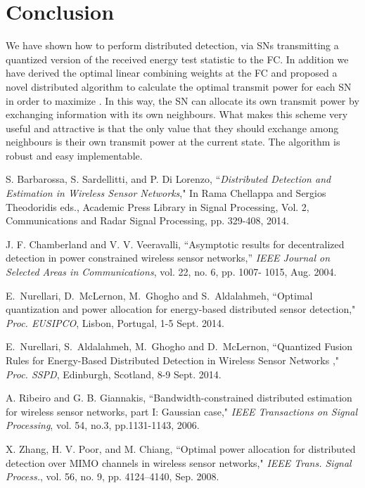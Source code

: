 \documentclass[conference]{IEEEtran}
\begin{document}
\section{Conclusion}
\label{CONCLUSION}
We have shown how to perform distributed detection, via SNs transmitting a quantized version of the received energy test statistic to the FC. In addition we have derived the optimal linear combining weights at the FC and proposed a novel distributed algorithm to calculate the optimal transmit power for each SN in order to maximize . In this way, the SN can allocate its own transmit power by exchanging information with its own neighbours. What makes this scheme very useful and attractive is that the only value that they should exchange among neighbours is their own transmit power at the current state. The algorithm is robust and easy implementable.
\begin{thebibliography}{80}

 S. Barbarossa, S. Sardellitti, and P. Di Lorenzo, ``\emph{Distributed Detection and Estimation in Wireless Sensor Networks}," In Rama Chellappa and Sergios Theodoridis eds., Academic Press Library in Signal Processing, Vol. 2, Communications and Radar Signal Processing, pp. 329-408, 2014.

 J. F. Chamberland and V. V. Veeravalli, ``Asymptotic results for decentralized detection in power constrained wireless sensor networks,'' \emph{IEEE Journal on Selected Areas in Communications}, vol. 22, no. 6, pp. 1007- 1015, Aug. 2004.


 E.~Nurellari, D.~McLernon, M.~Ghogho and S.~Aldalahmeh, ``Optimal quantization and power allocation for energy-based distributed sensor detection," \emph{Proc. EUSIPCO}, Lisbon, Portugal, 1-5 Sept. 2014.

 E.~Nurellari, S.~Aldalahmeh, M.~Ghogho and D.~McLernon, ``Quantized Fusion Rules for Energy-Based Distributed Detection in Wireless Sensor Networks ," \emph{Proc. SSPD}, Edinburgh, Scotland, 8-9 Sept. 2014.

 A. Ribeiro and G. B. Giannakis, ``Bandwidth-constrained distributed estimation for wireless sensor networks, part I: Gaussian case," \emph{IEEE  Transactions on Signal Processing}, vol. 54, no.3, pp.1131-1143, 2006.


 X. Zhang, H. V. Poor, and M. Chiang, ``Optimal power allocation for distributed detection over MIMO channels in wireless sensor networks,"\emph{ IEEE Trans. Signal Process.}, vol. 56, no. 9, pp. 4124–4140, Sep. 2008.



\end{thebibliography}
\end{document}
